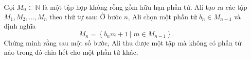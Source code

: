 \ifshowproblem
\begin{problem}\label{example:IRN-2015-MO3-NP2}
	Gọi $M_0 \subset \mathbb{N}$ là một tập hợp không rỗng gồm hữu hạn phần tử.  
	Ali tạo ra các tập $M_1, M_2, \ldots, M_n$ theo thứ tự sau:  
	Ở bước $n$, Ali chọn một phần tử $b_n \in M_{n-1}$ và định nghĩa  
	\[
		M_n = \left\{ b_n m + 1 \mid m \in M_{n-1} \right\}.
	\]  
	Chứng minh rằng sau một số bước, Ali thu được một tập mà không có phần tử nào trong đó chia hết cho một phần tử khác.
\end{problem}
\fi

\footnotemark
{}
\fi